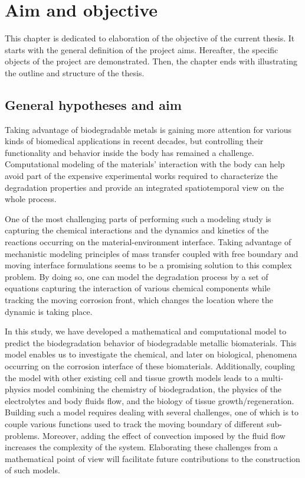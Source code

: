 \chapter{Aim and objective}\label{ch:objective}

This chapter is dedicated to elaboration of the objective of the current thesis. It starts with the general definition of the project aims. Hereafter, the specific objects of the project are demonstrated. Then, the chapter ends with illustrating the outline and structure of the thesis.


\section{General hypotheses and aim}


Taking advantage of biodegradable metals is gaining more attention for various kinds of biomedical applications in recent decades, but controlling their functionality and behavior inside the body has remained a challenge. Computational modeling of the materials' interaction with the body can help avoid part of the expensive experimental works required to characterize the degradation properties and provide an integrated spatiotemporal view on the whole process.

One of the most challenging parts of performing such a modeling study is capturing the chemical interactions and the dynamics and kinetics of the reactions occurring on the material-environment interface. Taking advantage of mechanistic modeling principles of mass transfer coupled with free boundary and moving interface formulations seems to be a promising solution to this complex problem. By doing so, one can model the degradation process by a set of equations capturing the interaction of various chemical components while tracking the moving corrosion front, which changes the location where the dynamic is taking place.

In this study, we have developed a mathematical and computational model to predict the biodegradation behavior of biodegradable metallic biomaterials. This model enables us to investigate the chemical, and later on biological, phenomena occurring on the corrosion interface of these biomaterials. Additionally, coupling the model with other existing cell and tissue growth models leads to a multi-physics model combining the chemistry of biodegradation, the physics of the electrolytes and body fluids flow, and the biology of tissue growth/regeneration. Building such a model requires dealing with several challenges, one of which is to couple various functions used to track the moving boundary of different sub-problems. Moreover, adding the effect of convection imposed by the fluid flow increases the complexity of the system. Elaborating these challenges from a mathematical point of view will facilitate future contributions to the construction of such models. 


